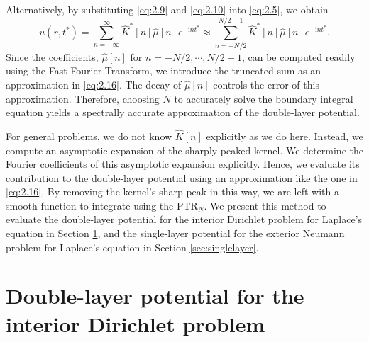 \documentclass{article}[12pt]
\numberwithin{equation}{section}
\begin{document}
Alternatively, by substituting \eqref{eq:2.9} and
  \eqref{eq:2.10} into \eqref{eq:2.5}, we obtain
\begin{equation}
  u(r,t^{\ast}) = \sum_{n = -\infty}^{\infty} \hat{K}^{\ast}[n]
  \hat{\mu}[n] e^{- \mathrm{i} n t^\ast} \approx \sum_{n =
    -N/2}^{N/2-1} \hat{K}^{\ast}[n] \hat{\mu}[n] e^{- \mathrm{i} n
    t^\ast}.
  \label{eq:2.16}
\end{equation}
Since the coefficients, $\hat{\mu}[n]$ for $n = -N/2, \cdots, N/2-1$,
can be computed readily using the Fast Fourier Transform, we introduce
the truncated sum as an approximation in \eqref{eq:2.16}. The decay of
$\hat{\mu}[n]$ controls the error of this approximation. Therefore,
choosing $N$ to accurately solve the boundary integral equation yields
a spectrally accurate approximation of the double-layer potential.

For general problems, we do not know $\hat{K}[n]$ explicitly as we do
here. Instead, we compute an asymptotic expansion of
  the sharply peaked kernel. We determine the Fourier
coefficients of this asymptotic expansion explicitly.  Hence, we
evaluate its contribution to the double-layer potential using an
approximation like the one in \eqref{eq:2.16}. By removing the
kernel's sharp peak in this way, we are left with a smooth function to
integrate using the PTR$_{N}$. We present this
method to evaluate the double-layer potential for the
interior Dirichlet problem for Laplace's equation in Section
\ref{sec:doublelayer}, and the single-layer potential for the exterior
Neumann problem for Laplace's equation in Section
\ref{sec:singlelayer}.

\section{Double-layer potential for the interior Dirichlet problem}
\label{sec:doublelayer}
\end{document}
